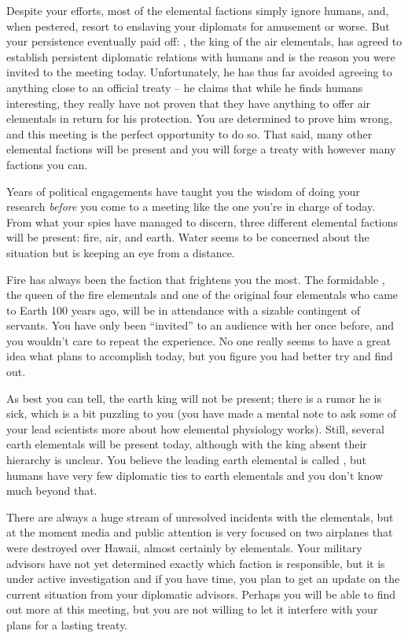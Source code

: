 \documentclass[char]{elementals}
\begin{document}
Despite your efforts, most of the elemental factions simply ignore humans, and, when pestered, resort to enslaving your diplomats for amusement or worse. But your persistence eventually paid off: \cKing{\intro}, the king of the air elementals, has agreed to establish persistent diplomatic relations with humans and is the reason you were invited to the meeting today. Unfortunately, he has thus far avoided agreeing to anything close to an official treaty -- he claims that while he finds humans interesting, they really have not proven that they have anything to offer air elementals in return for his protection. You are determined to prove him wrong, and this meeting is the perfect opportunity to do so. That said, many other elemental factions will be present and you will forge a treaty with however many factions you can.

Years of political engagements have taught you the wisdom of doing your research \emph{before} you come to a meeting like the one you're in charge of today. From what your spies have managed to discern, three different elemental factions will be present: fire, air, and earth. Water seems to be concerned about the situation but is keeping an eye from a distance.


Fire has always been the faction that frightens you the most. The formidable \cQueen{\intro}, the queen of the fire elementals and one of the original four elementals who came to Earth 100 years ago, will be in attendance with a sizable contingent of servants. You have only been ``invited'' to an audience with her once before, and you wouldn't care to repeat the experience. No one really seems to have a great idea what \cQueen{} plans to accomplish today, but you figure you had better try and find out.

As best you can tell, the earth king will not be present; there is a rumor he is sick, which is a bit puzzling to you (you have made a mental note to ask some of your lead scientists more about how elemental physiology works). Still, several earth elementals will be present today, although with the king absent their hierarchy is unclear. You believe the leading earth elemental is called \cLoyal{\intro}, but humans have very few diplomatic ties to earth elementals and you don't know much beyond that.

There are always a huge stream of unresolved incidents with the elementals, but at the moment media and public attention is very focused on two airplanes that were destroyed over Hawaii, almost certainly by elementals. Your military advisors have not yet determined exactly which faction is responsible, but it is under active investigation and if you have time, you plan to get an update on the current situation from your diplomatic advisors. Perhaps you will be able to find out more at this meeting, but you are not willing to let it interfere with your plans for a lasting treaty.
\end{document}
